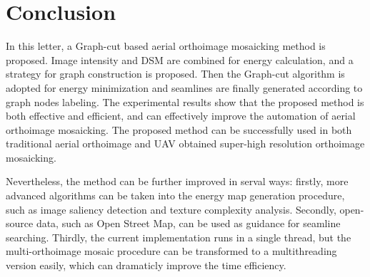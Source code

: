 \documentclass[journal]{IEEEtran}
\begin{document}
\section{Conclusion}
In this letter, a Graph-cut based aerial orthoimage mosaicking method is proposed. Image intensity and DSM are combined for energy calculation, and a strategy for graph construction is proposed. Then the Graph-cut algorithm is adopted for energy minimization and seamlines are finally generated according to graph nodes labeling. The experimental results show that the proposed method is both effective and efficient, and can effectively improve the automation of aerial orthoimage mosaicking. The proposed method can be successfully used in both traditional aerial orthoimage and UAV obtained super-high resolution orthoimage mosaicking. 

Nevertheless, the method can be further improved in serval ways: firstly, more advanced algorithms can be taken into the energy map generation procedure, such as image saliency detection and texture complexity analysis. Secondly, open-source data, such as Open Street Map, can be used as guidance for seamline searching. Thirdly, the current implementation runs in a single thread, but the multi-orthoimage mosaic procedure can be transformed to a multithreading version easily, which can dramaticly improve the time efficiency.

\ifCLASSOPTIONcaptionsoff
  \newpage
\fi

{
\small


}
\end{document}
